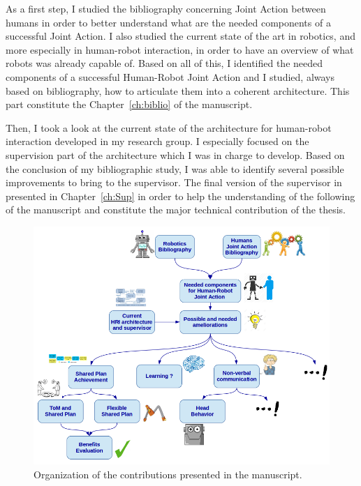 \documentclass[english,a4paper,11pt,twoside]{StyleThese}
\begin{document}
As a first step, I studied the bibliography concerning Joint Action between humans in order to better understand what are the needed components of a successful Joint Action. I also studied the current state of the art in robotics, and more especially in human-robot interaction, in order to have an overview of what robots was already capable of. Based on all of this, I identified the needed components of a successful Human-Robot Joint Action and I studied, always based on bibliography, how to articulate them into a coherent architecture. This part constitute the Chapter~\ref{ch:biblio} of the manuscript.

Then, I took a look at the current state of the architecture for human-robot interaction developed in my research group. I especially focused on the supervision part of the architecture which I was in charge to develop. Based on the conclusion of my bibliographic study, I was able to identify several possible improvements to bring to the supervisor. The final version of the supervisor in presented in Chapter~\ref{ch:Sup} in order to help the understanding of the following of the manuscript and constitute the major technical contribution of the thesis.

\begin{figure}[!t]
	\centering
    \includegraphics[width=\textwidth]{figs/Introduction/Plan.png}
    \caption{Organization of the contributions presented in the manuscript.}
    \label{fig:planIntro}
\end{figure}
\end{document}
